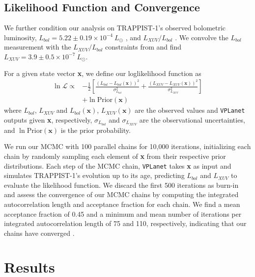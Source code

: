 \documentclass[twocolumn]{aastex62}
\newcommand{\vplanet}[0]{\texttt{VPLanet}\xspace}
\begin{document}
\subsection{Likelihood Function and Convergence}

We further condition our analysis on TRAPPIST-1's observed bolometric luminosity, $L_{bol} = 5.22 \pm{0.19} \times 10^{-4} \ L_{\odot}$ \citep{vanGrootel2018}, and $L_{XUV}/L_{bol}$ \citep{Wheatley2017}. We convolve the \citet{vanGrootel2018} $L_{bol}$ measurement with the $L_{XUV}/L_{bol}$ constraints from \citet{Wheatley2017} and find $L_{XUV} = 3.9 \pm{0.5} \times 10^{-7} \ L_{\odot}$.

For a given state vector \textbf{x}, we define our loglikelihood function as
\small
\begin{equation} \label{eqn:lnlike}
\begin{split}
    \ln \mathcal{L} \propto & -\frac{1}{2} \left[ \frac{(L_{bol} - L_{bol}(\textbf{x}))^2}{\sigma_{L_{bol}}^2} + \frac{(L_{XUV} - L_{XUV}(\textbf{x}))^2}{\sigma_{L_{XUV}}^2} \right] \\
    & + \ln \mathrm{Prior}(\textbf{x})
\end{split}
\end{equation}
\normalsize
where $L_{bol}$, $L_{XUV}$ and $L_{bol}(\textbf{x})$, $L_{XUV}(\textbf{x})$ are the observed values and \vplanet outputs given \textbf{x}, respectively, $\sigma_{L_{bol}}$ and $\sigma_{L_{XUV}}$ are the observational uncertainties, and $\ln \mathrm{Prior}(\textbf{x})$ is the prior probability. 

We run our MCMC with 100 parallel chains for 10,000 iterations, initializing each chain by randomly sampling each element of \textbf{x} from their respective prior distributions. Each step of the MCMC chain, \vplanet takes \textbf{x} as input and simulates TRAPPIST-1's evolution up to its age, predicting $L_{bol}$ and $L_{XUV}$ to evaluate the likelihood function. We discard the first 500 iterations as burn-in and assess the convergence of our MCMC chains by computing the integrated autocorrelation length and acceptance fraction for each chain. We find a mean acceptance fraction of 0.45 and a minimum and mean number of iterations per integrated autocorrelation length of 75 and 110, respectively, indicating that our chains have converged \citep{ForemanMackey2013}.


\section{Results} \label{sec:results}
\end{document}
